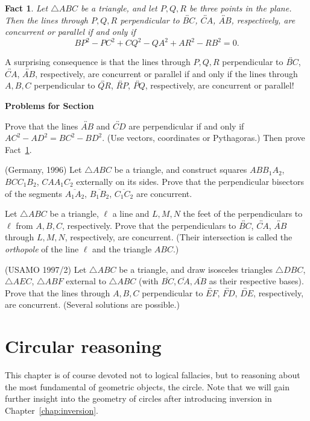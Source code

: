 \documentclass[12pt]{book}
\newcounter{exc}
\numberwithin{exc}{section}
\numberwithin{figure}{section}
\newenvironment{exer}{\vspace{0.1in}
\noindent \textbf{Problems for Section~\thesection} \vspace{0.1in}
\begin{list}{\arabic{exc}.}{\usecounter{exc}}}{\end{list}}
\newtheorem{fact}[theorem]{Fact}
\numberwithin{equation}{theorem}
\def\ii{\item}
\def\line#1{\overleftrightarrow{#1}}
\def\seg#1{\overline{#1}}
\begin{document}
\begin{fact} \label{thm:concperp}
Let $\triangle ABC$ be a triangle, and let $P, Q, R$ be three points in the 
plane. Then the lines through $P, Q, R$ 
perpendicular to $\line{BC}$, $\line{CA}$, $\line{AB}$, 
respectively, are concurrent or parallel if and 
only if
\[
BP^{2} - PC^{2} + CQ^{2} - QA^{2} + AR^{2} - RB^{2} = 0.
\]
\end{fact}
A surprising consequence is that the lines through $P,Q,R$ 
perpendicular to $\line{BC}$, $\line{CA}$, $\line{AB}$, 
respectively, are concurrent or parallel
if and only if the lines through $A,B,C$ perpendicular to 
$\line{QR}$, 
$\line{RP}$, 
$\line{PQ}$, respectively, are concurrent or parallel!

\begin{exer}
\ii \label{ex:perp criterion}
Prove that the lines $\line{AB}$ and $\line{CD}$ 
are perpendicular if and only if 
$AC^{2} - AD^{2} = BC^{2} - BD^{2}$. (Use vectors, coordinates 
or Pythagoras.) Then prove Fact~\ref{thm:concperp}.
\ii (Germany, 1996)
Let $\triangle ABC$ be a triangle, and construct squares $ABB_1A_2$, 
$BCC_1B_2$,
$CAA_1C_2$ externally on its sides. Prove that the perpendicular bisectors
of the segments $\seg{A_1A_2}$, $\seg{B_1B_2}$, $\seg{C_1C_2}$ are concurrent.
\ii
Let $\triangle ABC$ be a triangle, $\ell$ a line and
$L,M,N$ the feet of the perpendiculars to $\ell$ from $A,B,C$, 
respectively. Prove that the perpendiculars to $\line{BC}$, $\line{CA}$,
$\line{AB}$ 
through 
$L,M,N$, respectively, are concurrent. (Their intersection is called 
the \emph{orthopole} 
of the line $\ell$ and the triangle $ABC$.)
\ii
(USAMO 1997/2) \label{ex:usa97}
Let $\triangle ABC$ be a triangle, and draw isosceles triangles $\triangle 
DBC$, 
$\triangle AEC$, $\triangle ABF$ external to $\triangle ABC$ (with 
$\seg{BC}, \seg{CA}, \seg{AB}$ as their respective 
bases). Prove that the lines through $A,B,C$ perpendicular to 
$\line{EF}$, $\line{FD}$, $\line{DE}$, 
respectively, are concurrent. (Several solutions are
possible.)
\end{exer}

\chapter{Circular reasoning}

This chapter is of course devoted not to logical fallacies, but to
reasoning about the most fundamental of geometric objects, the circle.
Note that we will gain further insight into the geometry of circles after
introducing inversion in Chapter~\ref{chap:inversion}.
\end{document}
